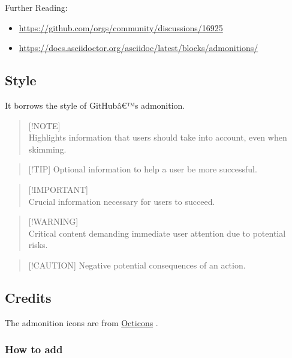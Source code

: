 \pandocbounded{}

Further Reading:

\begin{itemize}
\tightlist
\item
  \url{https://github.com/orgs/community/discussions/16925}
\item
  \url{https://docs.asciidoctor.org/asciidoc/latest/blocks/admonitions/}
\end{itemize}

\subsection{Style}\label{style}

It borrows the style of GitHubâ€™s admonition.

\begin{quote}
{[}!NOTE{]}\\
Highlights information that users should take into account, even when
skimming.
\end{quote}

\begin{quote}
{[}!TIP{]} Optional information to help a user be more successful.
\end{quote}

\begin{quote}
{[}!IMPORTANT{]}\\
Crucial information necessary for users to succeed.
\end{quote}

\begin{quote}
{[}!WARNING{]}\\
Critical content demanding immediate user attention due to potential
risks.
\end{quote}

\begin{quote}
{[}!CAUTION{]} Negative potential consequences of an action.
\end{quote}

\subsection{Credits}\label{credits}

The admonition icons are from
\href{https://github.com/primer/octicons}{Octicons} .

\subsubsection{How to add}\label{how-to-add}

